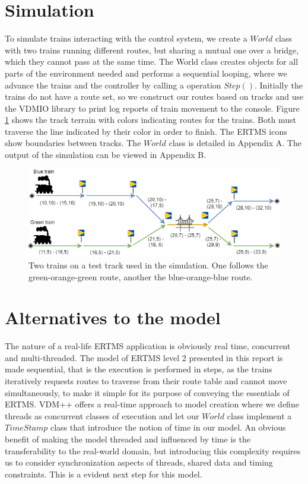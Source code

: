 \documentclass[preprint,12pt]{elsarticle}
\begin{document}
\section{Simulation}

To simulate trains interacting with the control system, we create a $World$ class with two trains running different routes, but sharing a mutual one over a bridge, which they cannot pass at the same time. The World class creates objects for all parts of the environment needed and performs a sequential looping, where we advance the trains and the controller by calling a operation $Step()$. Initially the trains do not have a route set, so we construct our routes based on tracks and use the VDMIO library to print log reports of train movement to the console. Figure \ref{fig:testtrack} shows the track terrain with colors indicating routes for the trains. Both must traverse the line indicated by their color in order to finish. The ERTMS icons show boundaries between tracks. The $World$ class is detailed in Appendix A. The output of the simulation can be viewed in Appendix B.

\begin{figure}[h]
	\centering
	\includegraphics[width=0.8\linewidth]{TrainTrack.png}
	\caption{Two trains on a test track used in the simulation. One follows the green-orange-green route, another the blue-orange-blue route.}
	\label{fig:testtrack}
\end{figure}

\section{Alternatives to the model}

The nature of a real-life ERTMS application is obviously real time, concurrent and multi-threaded. The model of ERTMS level 2 presented in this report is made sequential, that is the execution is performed in steps, as the trains iteratively requests routes to traverse from their route table and cannot move simultaneously, to make it simple for its purpose of conveying the essentials of ERTMS. VDM++ offers a real-time approach to model creation where we define threads as concurrent classes of execution and let our $World$ class implement a $TimeStamp$ class that introduce the notion of time in our model. An obvious benefit of making the model threaded and influenced by time is the transferability to the real-world domain, but introducing this complexity requires us to consider synchronization aspects of threads, shared data and timing constraints. This is a evident next step for this model.
\end{document}
